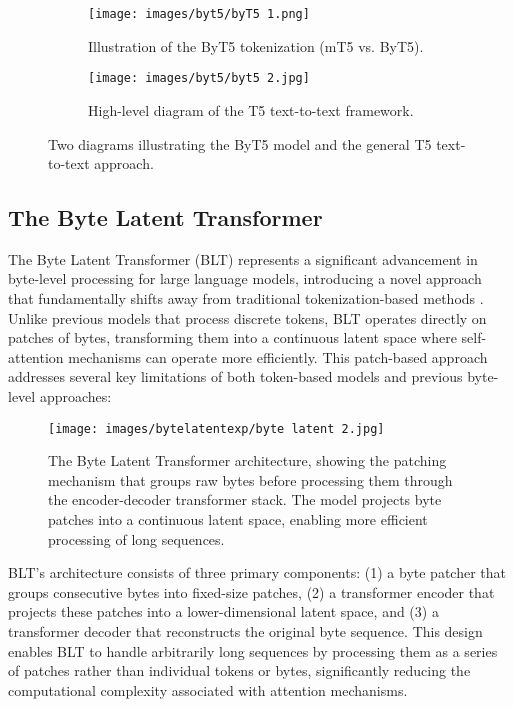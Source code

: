 \documentclass[a4paper, 11pt, twoside, openright]{report}
\begin{document}
\begin{figure}[ht]
    \centering
    \begin{subfigure}{0.45\textwidth}
        \centering
        \texttt{[image: images/byt5/byT5 1.png]}
        \caption{Illustration of the ByT5 tokenization (mT5 vs. ByT5).}
    \end{subfigure}
    \hfill
    \begin{subfigure}{0.45\textwidth}
        \centering
        \texttt{[image: images/byt5/byt5 2.jpg]}
        \caption{High-level diagram of the T5 text-to-text framework.}
    \end{subfigure}
    \caption{Two diagrams illustrating the ByT5 model and the general T5 text-to-text approach.}
    \label{fig:byt5}
\end{figure}

\subsection{The Byte Latent Transformer}
The Byte Latent Transformer (BLT) represents a significant advancement in byte-level processing for large language models, introducing a novel approach that fundamentally shifts away from traditional tokenization-based methods \cite{ByteLatentTransformer2024}. Unlike previous models that process discrete tokens, BLT operates directly on patches of bytes, transforming them into a continuous latent space where self-attention mechanisms can operate more efficiently. This patch-based approach addresses several key limitations of both token-based models and previous byte-level approaches:

\begin{figure}[h]
    \centering
    \texttt{[image: images/bytelatentexp/byte latent 2.jpg]}
    \caption{The Byte Latent Transformer architecture, showing the patching mechanism that groups raw bytes before processing them through the encoder-decoder transformer stack. The model projects byte patches into a continuous latent space, enabling more efficient processing of long sequences.}
    \label{fig:blt_architecture}
\end{figure}

BLT's architecture consists of three primary components: (1) a byte patcher that groups consecutive bytes into fixed-size patches, (2) a transformer encoder that projects these patches into a lower-dimensional latent space, and (3) a transformer decoder that reconstructs the original byte sequence. This design enables BLT to handle arbitrarily long sequences by processing them as a series of patches rather than individual tokens or bytes, significantly reducing the computational complexity associated with attention mechanisms.
\end{document}
